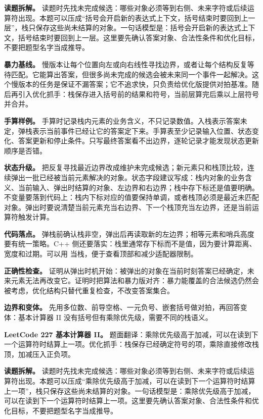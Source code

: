 \textbf{读题拆解。} 读题时先找未完成候选：哪些对象必须等到右侧、未来字符或后续运算符出现。本题可以压成“括号会开启新的表达式上下文，括号结束时要回到上一层”，栈只保存这些尚未结算的对象。一句话模型是：括号会开启新的表达式上下文，括号结束时要回到上一层。这里要先确认答案对象、合法性条件和优化目标，不要把题型名字当成推导。

\textbf{暴力基线。} 慢版本让每个位置向左或向右线性寻找边界，或者让每个结构反复等待匹配。它能算出答案，但很多尚未完成的候选会被未来同一个事件一起解决。这个慢版本的任务是保证不漏答案；它不追求快，只负责给优化版提供对拍基准。随后再引入优化抓手：栈保存进入括号前的结果和符号，当前层算完后乘以上层符号并合并。

\textbf{手算样例。} 手算时记录栈内元素的业务含义，不只记录数值。入栈表示答案未定，弹栈表示当前事件已经让它的答案定下来。手算表至少记录输入位置、状态变化、答案更新和停止条件。只写最终答案看不出边界，逐轮记录才能发现状态更新顺序是否错。

\textbf{状态升级。} 把反复寻找最近边界改成维护未完成候选；新元素只和栈顶比较，连续弹出一批已经被当前元素解决的对象。状态字段建议写成：栈内对象的业务含义、当前输入、弹出时结算的对象、左边界和右边界；栈中存下标还是值要明确。不变量要落到代码上：栈内下标对应的值要保持单调，或者栈顶必须是最近未匹配对象。弹出时要说清楚当前元素充当右边界、下一个栈顶充当左边界，还是当前运算符触发计算。

\textbf{代码落点。} 弹栈前确认栈非空，弹出后再读取新的左边界；相等元素和哨兵高度要有统一策略。C++ 侧还要落实：栈里通常存下标而不是值，因为要计算距离、宽度和过期。可以用  当栈，便于查看顶部和减少适配器限制。

\textbf{正确性检查。} 证明从弹出时机开始：被弹出的对象在当前时刻答案已经确定，未来元素无法再改变它。证明时把算法和暴力版对齐：暴力能覆盖的合法候选仍然会被考虑，优化结构只替代重复检查，不改变答案集合。

\textbf{边界和变体。} 先用多位数、前导空格、一元负号、嵌套括号做对拍，再回答变体：基本计算器 II 没有括号但有乘除优先级，需要不同的栈语义。

\noindent\textbf{LeetCode 227 基本计算器 II。} 题面翻译：乘除优先级高于加减，可以在读到下一个运算符时结算上一项。优化抓手：栈保存已经确定符号的项，乘除直接修改栈顶，加减压入正负项。

\textbf{读题拆解。} 读题时先找未完成候选：哪些对象必须等到右侧、未来字符或后续运算符出现。本题可以压成“乘除优先级高于加减，可以在读到下一个运算符时结算上一项”，栈只保存这些尚未结算的对象。一句话模型是：乘除优先级高于加减，可以在读到下一个运算符时结算上一项。这里要先确认答案对象、合法性条件和优化目标，不要把题型名字当成推导。


